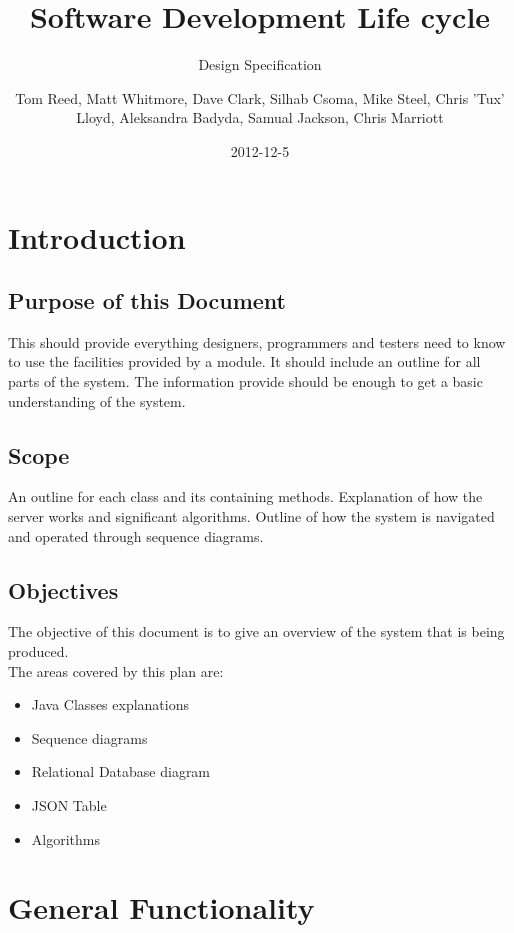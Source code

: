 \documentclass{project}
\begin{document}
\title{Software Development Life cycle}
\subtitle{Design Specification}
\author{Tom Reed, Matt Whitmore, Dave Clark, Silhab Csoma, Mike Steel, Chris 'Tux' Lloyd, Aleksandra Badyda, Samual Jackson, Chris Marriott}
\date{2012-12-5}
\maketitle
\tableofcontents
\newpage
\section{Introduction}
\subsection{Purpose of this Document}
This should provide everything designers, programmers and testers need to know to use the facilities
provided by a module. It should include an outline for all parts of the system. The information provide should be enough to get a basic understanding of the system.

\subsection{Scope}
An outline for each class and its containing methods. Explanation of how the server works and significant algorithms. Outline of how the system is navigated and operated through sequence diagrams.

\subsection{Objectives}
The objective of this document is to give an overview of the system that is being produced.
\\
The areas covered by this plan are:
\begin{itemize}
	\item Java Classes explanations
	\item Sequence diagrams
	\item Relational Database diagram
	\item JSON Table
	\item Algorithms
\end{itemize}

\section{General Functionality}
\end{document}
